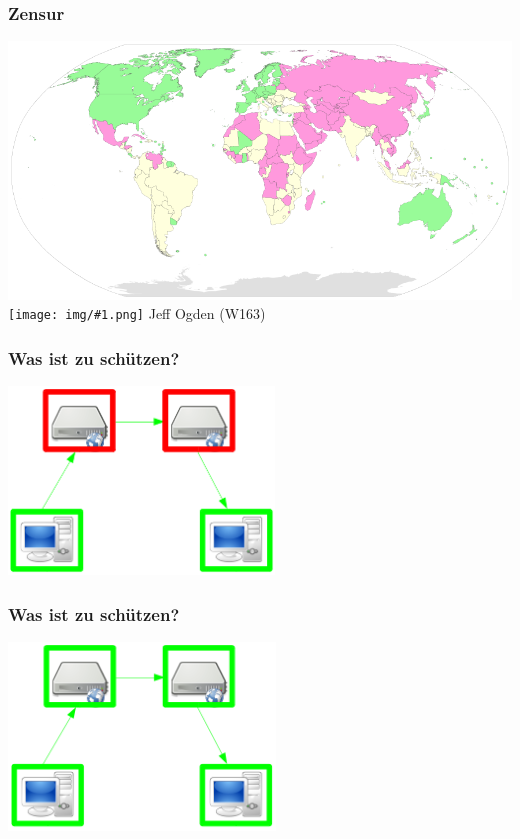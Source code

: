 \documentclass[12pt]{beamer}
\newcommand{\cc}[1]{\texttt{[image: img/\#1.png]}\hspace{1mm}}
\begin{document}
\begin{frame}
    \frametitle{Zensur}
    \includegraphics[height=0.7\textheight]{img/zensur.png}
    \\{\small \cc{by-sa} Jeff Ogden (W163)}
\end{frame}

\begin{frame}
    \frametitle{Was ist zu schützen?}
    \begin{center}
      \includegraphics[height=5cm]{img/fed-clients-comm.png}
    \end{center}
\end{frame}

\begin{frame}
    \frametitle{Was ist zu schützen?}
    \begin{center}
      \includegraphics[height=5cm]{img/fed-all.png}
    \end{center}
\end{frame}
\end{document}
